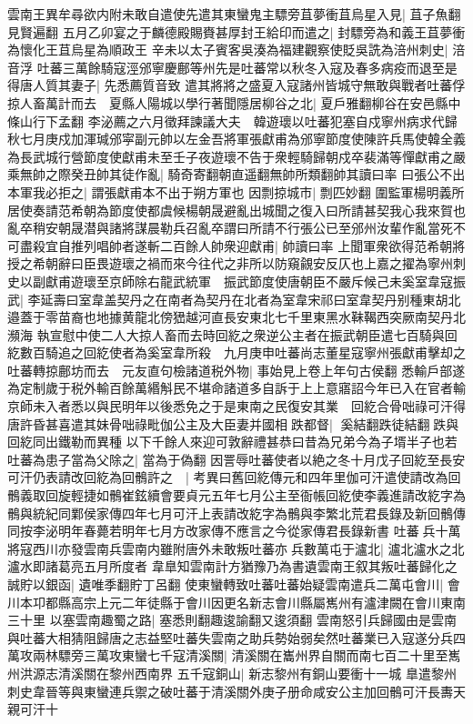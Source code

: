 雲南王異牟尋欲内附未敢自遣使先遣其東蠻鬼主驃旁苴夢衝苴烏星入見|{
	苴子魚翻見賢遍翻}
五月乙卯宴之于麟德殿賜賚甚厚封王給印而遣之|{
	封驃旁為和義王苴夢衝為懷化王苴烏星為順政王}
辛未以太子賓客吳湊為福建觀察使貶吳詵為涪州刺史|{
	涪音浮}
吐蕃三萬餘騎寇涇邠寧慶鄜等州先是吐蕃常以秋冬入寇及春多病疫而退至是得唐人質其妻子|{
	先悉薦質音致}
遣其將將之盛夏入寇諸州皆城守無敢與戰者吐蕃俘掠人畜萬計而去　夏縣人陽城以學行著聞隱居柳谷之北|{
	夏戶雅翻柳谷在安邑縣中條山行下孟翻}
李泌薦之六月徵拜諫議大夫　韓遊瓌以吐蕃犯塞自戍寧州病求代歸秋七月庚戍加渾瑊邠寜副元帥以左金吾將軍張獻甫為邠寧節度使陳許兵馬使韓全義為長武城行營節度使獻甫未至壬子夜遊瓌不告于衆輕騎歸朝戍卒裴滿等憚獻甫之嚴乘無帥之際癸丑帥其徒作亂|{
	騎奇寄翻朝直遥翻無帥所類翻帥其讀曰率}
曰張公不出本軍我必拒之|{
	謂張獻甫本不出于朔方軍也}
因剽掠城市|{
	剽匹妙翻}
圍監軍楊明義所居使奏請范希朝為節度使都虞候楊朝晟避亂出城聞之復入曰所請甚契我心我來賀也亂卒稍安朝晟潜與諸將謀晨勒兵召亂卒謂曰所請不行張公已至邠州汝輩作亂當死不可盡殺宜自推列唱帥者遂斬二百餘人帥衆迎獻甫|{
	帥讀曰率}
上聞軍衆欲得范希朝將授之希朝辭曰臣畏遊瓌之禍而來今往代之非所以防窺覦安反仄也上嘉之擢為寧州刺史以副獻甫遊瓌至京師除右龍武統軍　振武節度使唐朝臣不嚴斥候己未奚室韋寇振武|{
	李延壽曰室韋盖契丹之在南者為契丹在北者為室韋宋祁曰室韋契丹别種東胡北邉蓋于零苗裔也地據黄龍北傍峱越河直長安東北七千里東黑水靺鞨西突厥南契丹北瀕海}
執宣慰中使二人大掠人畜而去時回紇之衆逆公主者在振武朝臣遣七百騎與回紇數百騎追之回紇使者為奚室韋所殺　九月庚申吐蕃尚志董星寇寧州張獻甫擊却之吐蕃轉掠鄜坊而去　元友直句檢諸道税外物|{
	事始見上卷上年句古侯翻}
悉輸戶部遂為定制歲于税外輸百餘萬緡斛民不堪命諸道多自訴于上上意寤詔今年已入在官者輸京師未入者悉以與民明年以後悉免之于是東南之民復安其業　回紇合骨咄祿可汗得唐許昏甚喜遣其妹骨咄祿毗伽公主及大臣妻并國相跌都督|{
	奚結翻跌徒結翻跌與回紇同出鐵勒而異種}
以下千餘人來迎可敦辭禮甚恭曰昔為兄弟今為子壻半子也若吐蕃為患子當為父除之|{
	當為于偽翻}
因詈辱吐蕃使者以絶之冬十月戊子回紇至長安可汗仍表請改回紇為回鶻許之　|{
	考異曰舊回紇傳元和四年里伽可汗遣使請改為回鶻義取回旋輕捷如鶻崔鉉續會要貞元五年七月公主至衙帳回紇使李義進請改紇字為鶻與統紀同鄴侯家傳四年七月可汗上表請改紇字為鶻與李繁北荒君長錄及新回鶻傳同按李泌明年春薨若明年七月方改家傳不應言之今從家傳君長錄新書}
吐蕃兵十萬將寇西川亦發雲南兵雲南内雖附唐外未敢叛吐蕃亦兵數萬屯于瀘北|{
	瀘北瀘水之北瀘水即諸葛亮五月所度者}
韋臯知雲南計方猶豫乃為書遺雲南王叙其叛吐蕃歸化之誠貯以銀函|{
	遺唯季翻貯丁呂翻}
使東蠻轉致吐蕃吐蕃始疑雲南遣兵二萬屯會川|{
	會川本卭都縣高宗上元二年徒縣于會川因更名新志會川縣屬嶲州有瀘津闕在會川東南三十里}
以塞雲南趣蜀之路|{
	塞悉則翻趣逡諭翻又逡須翻}
雲南怒引兵歸國由是雲南與吐蕃大相猜阻歸唐之志益堅吐蕃失雲南之助兵勢始弱矣然吐蕃業已入寇遂分兵四萬攻兩林驃旁三萬攻東蠻七千寇清溪關|{
	清溪關在巂州界自關而南七百二十里至嶲州洪源志清溪關在黎州西南界}
五千寇銅山|{
	新志黎州有銅山要衝十一城}
臯遣黎州刺史韋晉等與東蠻連兵禦之破吐蕃于清溪關外庚子册命咸安公主加回鶻可汗長夀天親可汗十

